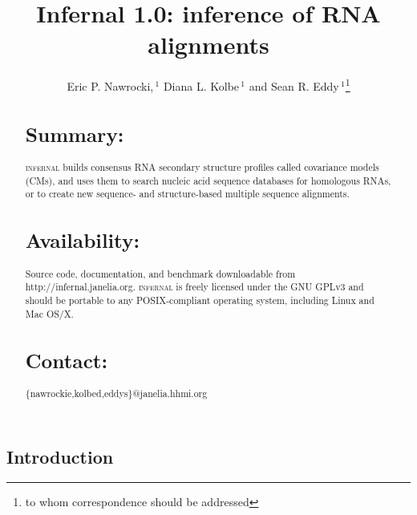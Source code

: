 \documentclass{bioinfo}
\begin{document}

\begin{application}

\title[Infernal 1.0]{Infernal 1.0: inference of RNA alignments}
\author[E. Nawrocki, D. Kolbe and S. Eddy]{Eric P. Nawrocki,\,$^1$ Diana L. Kolbe\,$^1$ and Sean R. Eddy\,$^1$\footnote{to whom correspondence should be addressed}}
\address{$^{1}$HHMI Janelia Farm Research Campus, Ashburn VA 20147, USA\\}



\maketitle


\begin{abstract}
\section{Summary:}
\textsc{infernal} builds consensus RNA secondary structure profiles
called covariance models (CMs), and uses them to search nucleic acid
sequence databases for homologous RNAs, or to create new sequence- and
structure-based multiple sequence alignments.
\section{Availability:}
Source code, documentation, and benchmark downloadable from
http://infernal.janelia.org. \textsc{infernal} is freely
licensed under the GNU GPLv3 and should be portable to any
POSIX-compliant operating system, including Linux and Mac OS/X.
\section{Contact:} \{nawrockie,kolbed,eddys\}@janelia.hhmi.org
\end{abstract}


\section{Introduction}


\end{application}
\end{document}
